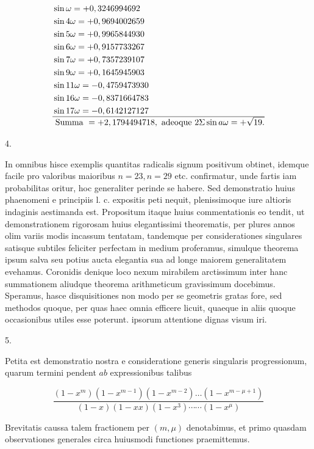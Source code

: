 \documentclass[10pt]{article}
\begin{document}
\[
\begin{aligned}
& \sin \omega=+0,3246994692 \\
& \sin 4 \omega=+0,9694002659 \\
& \sin 5 \omega=+0,9965844930 \\
& \sin 6 \omega=+0,9157733267 \\
& \sin 7 \omega=+0,7357239107 \\
& \sin 9 \omega=+0,1645945903 \\
& \sin 11 \omega=-0,4759473930 \\
& \sin 16 \omega=-0,8371664783 \\
& \sin 17 \omega=-0,6142127127 \\ \hline
& \text { Summa }=+2,1794494718, \text { adeoque } 2 \Sigma \sin a \omega=+\sqrt{19 .}
\end{aligned}
\]

4.

In omnibus hisce exemplis quantitas radicalis signum positivum obtinet, idemque facile pro valoribus maioribus \(n=23, n=29\) etc. confirmatur, unde fartis iam probabilitas oritur, hoc generaliter perinde se habere. Sed demonstratio huius phaenomeni e principiis l. c. expositis peti nequit, plenissimoque iure altioris indaginis aestimanda est. Propositum itaque huius commentationis eo tendit, ut demonstrationem rigorosam huius elegantissimi theorematis, per plures annos olim variis modis incassum tentatam, tandemque per considerationes singulares satisque subtiles feliciter perfectam in medium proferamus, simulque theorema ipsum salva seu potius aucta elegantia sua ad longe maiorem generalitatem evehamus. Coronidis denique loco nexum mirabilem arctissimum inter hanc summationem aliudque theorema arithmeticum gravissimum docebimus. Speramus, hasce disquisitiones non modo per se geometris gratas fore, sed methodos quoque, per quas haec omnia efficere licuit, quaeque in aliis quoque occasionibus utiles esse poterunt. ipsorum attentione dignas visum iri.

5.

Petita est demonstratio nostra e consideratione generis singularis progressionum, quarum termini pendent \(a b\) expressionibus talibus

\[
\frac{\left(1-x^{m}\right)\left(1-x^{m-1}\right)\left(1-x^{m-2}\right) \ldots\left(1-x^{m-\mu+1}\right)}{(1-x)(1-x x)\left(1-x^{3}\right) \cdots \cdots\left(1-x^{\mu}\right)}
\]

Brevitatis caussa talem fractionem per \((m, \mu)\) denotabimus, et primo quasdam observationes generales circa huiusmodi functiones praemittemus.
\end{document}
